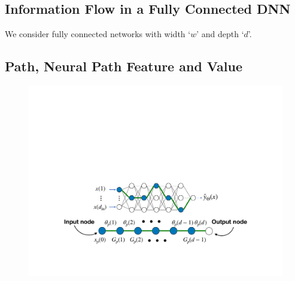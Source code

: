 \subsection{Information Flow in a Fully Connected DNN}
We consider fully connected networks with width `$w$' and depth `$d$'.
\begin{table}[h]
\centering
{}
\caption{\small{Information flow in a FC-DNN with ReLU. Here, `$q$'s are pre-activation inputs, `$z$'s are output of the hidden layers, `$G$'s are the gating values. $l\in[d-1]$ is the index of the layer, $\iout$ and $\iin$ are indices of  nodes in the current and previous layer respectively.}}
\label{tb:basic}
\end{table}

\subsection{Path, Neural Path Feature and Value}
\FloatBarrier
\begin{figure}[h]
\centering
\includegraphics[scale=0.32]{figs/paths.pdf}
\end{figure}

